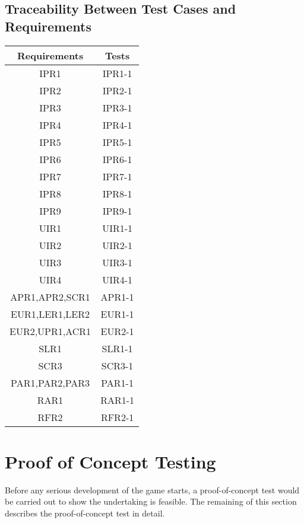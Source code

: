 \documentclass[12pt, titlepage]{article}
\begin{document}
\subsection{Traceability Between Test Cases and Requirements}
\begin{center}
    \begin{tabular}{||c | c ||}
    \hline
    Requirements & Tests\\
    \hline
    IPR1&IPR1-1\\
    \hline
    IPR2&IPR2-1\\
    \hline
    IPR3&IPR3-1\\
    \hline
    IPR4&IPR4-1\\
    \hline
    IPR5&IPR5-1\\
    \hline
    IPR6&IPR6-1\\
    \hline
    IPR7&IPR7-1\\
    \hline
    IPR8&IPR8-1\\
    \hline
    IPR9&IPR9-1\\
    \hline
    UIR1&UIR1-1\\
    \hline
    UIR2&UIR2-1\\
    \hline
    UIR3&UIR3-1\\
    \hline
    UIR4&UIR4-1\\
    \hline
    APR1,APR2,SCR1 & APR1-1\\
    \hline
    EUR1,LER1,LER2 & EUR1-1\\
    \hline
    EUR2,UPR1,ACR1 & EUR2-1\\
    \hline
    SLR1 & SLR1-1\\
    \hline
    SCR3 & SCR3-1\\
    \hline
    PAR1,PAR2,PAR3 & PAR1-1\\
    \hline
    RAR1 & RAR1-1\\
    \hline
    RFR2 & RFR2-1\\
    \hline
    \end{tabular}
    
\end{center}

\section{Proof of Concept Testing}
Before any serious development of the game starts, a proof-of-concept test would be carried out to show the undertaking is feasible. The remaining of this section describes the proof-of-concept test in detail.
\end{document}
